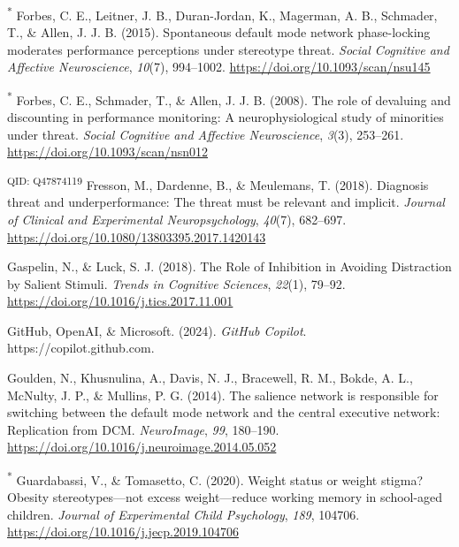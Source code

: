 \documentclass[
  stu, a4paper,floatsintext]{apa7}
\newlength{\cslhangindent}
\newenvironment{CSLReferences}[2] %
 {\begin{list}{}{%
  \setlength{\itemindent}{0pt}
  \setlength{\leftmargin}{0pt}
  \setlength{\parsep}{0pt}
  \ifodd #1
   \setlength{\leftmargin}{\cslhangindent}
   \setlength{\itemindent}{-1\cslhangindent}
  \fi
  \setlength{\itemsep}{#2\baselineskip}}}
 {\end{list}}
\begin{document}
\begin{CSLReferences}{1}{0}
\textsuperscript{*} Forbes, C. E., Leitner, J. B., Duran-Jordan, K., Magerman, A. B., Schmader, T., \& Allen, J. J. B. (2015). Spontaneous default mode network phase-locking moderates performance perceptions under stereotype threat. \emph{Social Cognitive and Affective Neuroscience}, \emph{10}(7), 994--1002. \url{https://doi.org/10.1093/scan/nsu145}

\textsuperscript{*} Forbes, C. E., Schmader, T., \& Allen, J. J. B. (2008). The role of devaluing and discounting in performance monitoring: A neurophysiological study of minorities under threat. \emph{Social Cognitive and Affective Neuroscience}, \emph{3}(3), 253--261. \url{https://doi.org/10.1093/scan/nsn012}

\textsuperscript{QID: Q47874119} Fresson, M., Dardenne, B., \& Meulemans, T. (2018). Diagnosis threat and underperformance: {The} threat must be relevant and implicit. \emph{Journal of Clinical and Experimental Neuropsychology}, \emph{40}(7), 682--697. \url{https://doi.org/10.1080/13803395.2017.1420143}

Gaspelin, N., \& Luck, S. J. (2018). The {Role} of {Inhibition} in {Avoiding Distraction} by {Salient Stimuli}. \emph{Trends in Cognitive Sciences}, \emph{22}(1), 79--92. \url{https://doi.org/10.1016/j.tics.2017.11.001}

GitHub, OpenAI, \& Microsoft. (2024). \emph{{GitHub Copilot}}. https://copilot.github.com.

Goulden, N., Khusnulina, A., Davis, N. J., Bracewell, R. M., Bokde, A. L., McNulty, J. P., \& Mullins, P. G. (2014). The salience network is responsible for switching between the default mode network and the central executive network: {Replication} from {DCM}. \emph{NeuroImage}, \emph{99}, 180--190. \url{https://doi.org/10.1016/j.neuroimage.2014.05.052}

\textsuperscript{*} Guardabassi, V., \& Tomasetto, C. (2020). Weight status or weight stigma? {Obesity} stereotypes---not excess weight---reduce working memory in school-aged children. \emph{Journal of Experimental Child Psychology}, \emph{189}, 104706. \url{https://doi.org/10.1016/j.jecp.2019.104706}


\end{CSLReferences}
\end{document}
